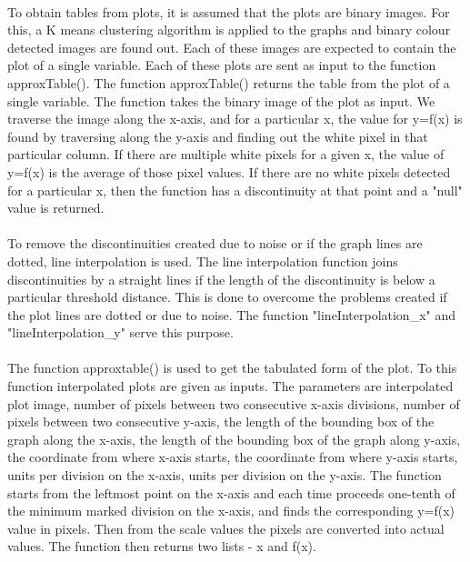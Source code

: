 \documentclass[a4paper,10pt]{scrreprt}
\begin{document}
\paragraph{}
To obtain tables from plots, it is assumed that the plots are binary images. For this, a K means clustering algorithm is applied to the graphs and binary colour detected images are found out. Each of these images are expected to contain the plot of a single variable. Each of these plots are sent as input to the function approxTable(). The function approxTable() returns the table from the plot of a single variable. The function takes the binary image of the plot as input. We traverse the image along the x-axis, and for a particular x, the value for y=f(x) is found by traversing along the y-axis and finding out the white pixel in that particular column. If there are multiple white pixels for a given x, the value of y=f(x) is the average of those pixel values. If there are no white pixels detected for a particular x, then the function has a discontinuity at that point and a "null" value is returned.
\paragraph{}
To remove the discontinuities created due to noise or if the graph lines are dotted, line interpolation is used. The line interpolation function joins discontinuities by a straight lines if the length of the discontinuity is below a particular threshold distance. This is done to overcome the problems created if the plot lines are dotted or due to noise. The  function "lineInterpolation_x" and "lineInterpolation_y" serve this purpose.
\paragraph{}
The function approxtable() is used to get the tabulated form of the plot. To this function interpolated plots are given as inputs. The parameters are interpolated plot image, number of pixels between two consecutive x-axis divisions, number of pixels between two consecutive y-axis, the length of the bounding box of the graph along the x-axis, the length of the bounding box of the graph along y-axis, the coordinate from where x-axis starts, the coordinate from where y-axis starts, units per division on the x-axis, units per division on the y-axis.
The function starts from the leftmost point on the x-axis and each time proceeds one-tenth of the minimum marked division on the x-axis, and finds the corresponding y=f(x) value in pixels. Then from the scale values the pixels are converted into actual values. The function then returns two lists - x and f(x).
  
\end{document}
